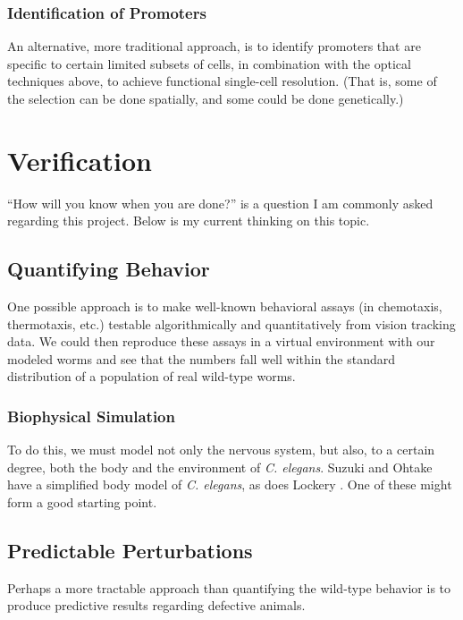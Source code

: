 \documentclass[letter,11pt]{article}
\newcommand{\cel}{{\em C. elegans}}
\begin{document}
\subsubsection{Identification of Promoters}

An alternative, more traditional approach, is to identify promoters that are specific
to certain limited subsets of cells, in combination with the optical techniques above,
to achieve functional single-cell resolution. (That is, some of the selection can be
done spatially, and some could be done genetically.)


\section{Verification}


``How will you know when you are done?'' is a question I am commonly asked regarding this project.
Below is my current thinking on this topic.

\subsection{Quantifying Behavior}

One possible approach is to make well-known behavioral assays (in chemotaxis,
thermotaxis, etc.) testable algorithmically and quantitatively from vision
tracking data.  We could then reproduce these assays in a virtual environment
with our modeled worms and see that the numbers fall well within the standard
distribution of a population of real wild-type worms.

\subsubsection{Biophysical Simulation}

To do this, we must model not only the nervous system, but also, to a certain degree, both the body and the environment of \cel .
Suzuki and Ohtake \cite{ohtake} have a simplified body model of \cel , as does Lockery \cite{lockery1010}. One of these might form
a good starting point.

\subsection{Predictable Perturbations}

Perhaps a more tractable approach than quantifying the wild-type behavior is to produce predictive results regarding defective animals.
\end{document}
